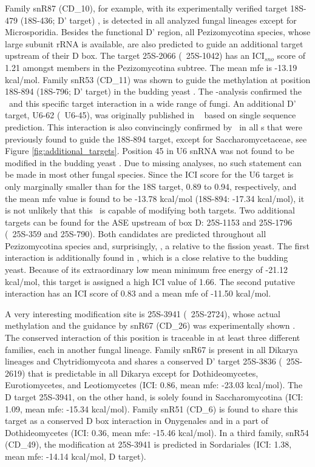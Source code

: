 Family snR87 (CD\_10), for example, with its experimentally verified
target 18S-479 (18S-436; D' target) \cite{Davis:2006}, is detected in
all analyzed fungal lineages except for Microsporidia. Besides the
functional D' region, all Pezizomycotina species, whose large subunit
rRNA is available, are also predicted to guide an additional target
upstream of their D box. The target 25S-2066 (\ncr\ 25S-1042) has an
ICI$_{sno}$ score of 1.21 amongst members in the Pezizomycotina
subtree. The mean mfe is -13.19 kcal/mol.  Family snR53 (CD\_11) was
shown to guide the methylation at position 18S-894 (18S-796; D'
target) in the budding yeast \cite{Lowe:1999}. The \snostrip-analysis
confirmed the \sno\ and this specific target interaction in a wide
range of fungi. An additional D' target, U6-62 (\sce\ U6-45), was
originally published in \ncr\ \cite{Liu:2009} based on single sequence
prediction. This interaction is also convincingly confirmed by
\snostrip\ in all \sno s that were previously found to guide the
18S-894 target, except for Saccharomycetaceae, see Figure
\ref{fig:additional_targets}. Position 45 in U6 snRNA was not found to
be modified in the budding yeast \cite{Machnicka:2013,
  Massenet:1998}. Due to missing analyses, no such statement can be
made in most other fungal species. Since the ICI score for the U6
target is only marginally smaller than for the 18S target, 0.89 to 0.94,
respectively, and the mean mfe value is found to be -13.78 kcal/mol
(18S-894: -17.34 kcal/mol), it is not unlikely that this \sno\ is
capable of modifying both targets. Two additional targets can be found
for the ASE upstream of box D: 25S-1153 and 25S-1796 (\ncr\ 25S-359
and 25S-790). Both candidates are predicted throughout all
Pezizomycotina species and, surprisingly, \Tde, a relative to the
fission yeast. The first interaction is additionally found in \Yli, which is a
close relative to the budding yeast. Because of its extraordinary low
mean minimum free energy of -21.12 kcal/mol, this target is assigned a
high ICI value of 1.66. The second putative interaction has an ICI
score of 0.83 and a mean mfe of -11.50 kcal/mol.

A very interesting modification site is 25S-3941 (\sce\ 25S-2724),
whose actual methylation and the guidance by snR67 (CD\_26) was
experimentally shown \cite{Lowe:1999}. The conserved interaction of
this position is traceable in at least three different families, each
in another fungal lineage. Family snR67 is present in all Dikarya
lineages and Chytridiomycota and shares a conserved D' target 25S-3836
(\sce\ 25S-2619) that is predictable in all Dikarya except for
Dothideomycetes, Eurotiomycetes, and Leotiomycetes (ICI: 0.86, mean
mfe: -23.03 kcal/mol). The D target 25S-3941, on the other hand, is
solely found in Saccharomycotina (ICI: 1.09, mean mfe: -15.34
kcal/mol). Family snR51 (CD\_6) is found to share this target as a
conserved D box interaction in Onygenales and in a part of
Dothideomycetes (ICI: 0.36, mean mfe: -15.46 kcal/mol). In a third
family, snR54 (CD\_49), the modification at 25S-3941 is predicted in
Sordariales (ICI: 1.38, mean mfe: -14.14 kcal/mol, D target).


